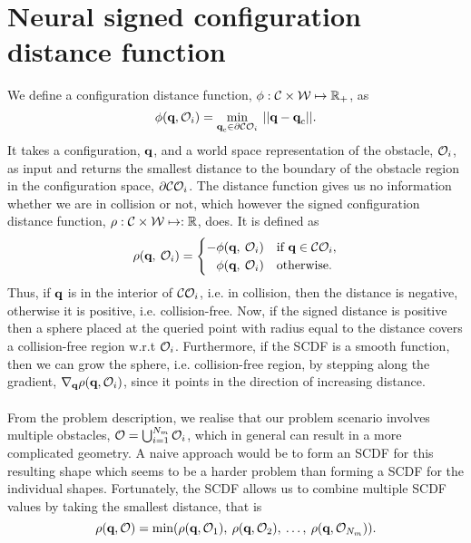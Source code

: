 \documentclass[../main.tex]{subfiles}
\begin{document}
\section{Neural signed configuration distance function}
\label{sec:NSCDF}
We define a configuration distance function, $\phi: \mathcal{C} \times \mathcal{W} \mapsto \mathbb{R}_+ $, as
\begin{equation}
\phi(\textbf{q}, \mathcal{O}_i) = \min_{\textbf{q}_{\text{c}} \in \partial\mathcal{C}\mathcal{O}_i} \: ||\textbf{q} - \textbf{q}_{\text{c}}||.
\end{equation}
It takes a configuration, $\textbf{q}$, and a world space representation of the obstacle, $\mathcal{O}_i$, as input and returns the smallest distance to the boundary of the obstacle region in the configuration space, $\partial\mathcal{C}\mathcal{O}_i$. The distance function gives us no information whether we are in collision or not, which however the signed configuration distance function, $\rho: \mathcal{C} \times \mathcal{W} \mapsto: \mathbb{R} $, does. It is defined as 
\begin{equation}
\rho(\textbf{q}, \: \mathcal{O}_i) = 
\begin{cases}
-\phi(\textbf{q}, \: \mathcal{O}_i) & \text{if } \textbf{q} \in \mathcal{C}\mathcal{O}_i, \\
\hphantom{-} \phi(\textbf{q}, \: \mathcal{O}_i) & \text{otherwise.}
\end{cases}
\end{equation}
Thus, if $\textbf{q}$ is in the interior of $\mathcal{C}\mathcal{O}_i$, i.e. in collision, then the distance is negative, otherwise it is positive, i.e. collision-free. Now, if the signed distance is positive then a sphere placed at the queried point with radius equal to the distance covers a collision-free region w.r.t $\mathcal{O}_i$. Furthermore, if the SCDF is a smooth function, then we can grow the sphere, i.e. collision-free region, by stepping along the gradient, $\nabla_{\textbf{q}} \rho(\textbf{q}, \mathcal{O}_i)$, since it points in the direction of increasing distance.
\\\\
From the problem description, we realise that our problem scenario involves multiple obstacles, $\mathcal{O}=\bigcup_{i=1}^{N_{m}} \mathcal{O}_i$, which in general can result in a more complicated geometry. A naive approach would be to form an SCDF for this resulting shape which seems to be a harder problem than forming a SCDF for the individual shapes. Fortunately, the SCDF allows us to combine multiple SCDF values by taking the smallest distance, that is 
\begin{equation}
\label{eq:scdf:min}
\rho(\textbf{q}, \mathcal{O}) =  \text{min}(\rho(\textbf{q}, \mathcal{O}_1), \: \rho(\textbf{q}, \mathcal{O}_2), \: \hdots, \: \rho(\textbf{q}, \mathcal{O}_{N_{m}})).
\end{equation}
\end{document}
